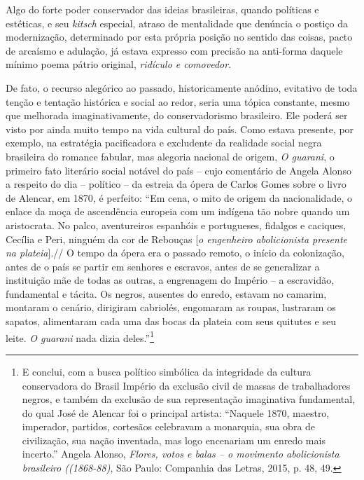 Algo do forte poder conservador das ideias brasileiras, quando políticas
e estéticas, e seu \emph{kitsch} especial, atraso de mentalidade que
denúncia o postiço da modernização, determinado por esta própria posição
no sentido das coisas, pacto de arcaísmo e adulação, já estava expresso
com precisão na anti-forma daquele mínimo poema pátrio original,
\emph{ridículo e comovedor}.

De fato, o recurso alegórico ao passado, historicamente anódino,
evitativo de toda tenção e tentação histórica e social ao redor, seria
uma tópica constante, mesmo que melhorada imaginativamente, do
conservadorismo brasileiro. Ele poderá ser visto por ainda muito tempo
na vida cultural do país. Como estava presente, por exemplo, na
estratégia pacificadora e excludente da realidade social negra
brasileira do romance fabular, mas alegoria nacional de origem, \emph{O
guarani}, o primeiro fato literário social notável do país -- cujo
comentário de Angela Alonso a respeito do dia -- político -- da estreia
da ópera de Carlos Gomes sobre o livro de Alencar, em 1870, é perfeito:
``Em cena, o mito de origem da nacionalidade, o enlace da moça de
ascendência europeia com um indígena tão nobre quando um aristocrata. No
palco, aventureiros espanhóis e portugueses, fidalgos e caciques,
Cecília e Peri, ninguém da cor de Rebouças {[}\emph{o engenheiro
abolicionista presente na plateia}{]}.// O tempo da ópera era o passado
remoto, o início da colonização, antes de o país se partir em senhores e
escravos, antes de se generalizar a instituição mãe de todas as outras,
a engrenagem do Império -- a escravidão, fundamental e tácita. Os
negros, ausentes do enredo, estavam no camarim, montaram o cenário,
dirigiram cabriolés, engomaram as roupas, lustraram os sapatos,
alimentaram cada uma das bocas da plateia com seus quitutes e seu leite.
\emph{O guarani} nada dizia deles.''\footnote{E conclui, com a busca
  político simbólica da integridade da cultura conservadora do Brasil
  Império da exclusão civil de massas de trabalhadores negros, e também
  da exclusão de sua representação imaginativa fundamental, do qual José
  de Alencar foi o principal artista: ``Naquele 1870, maestro,
  imperador, partidos, cortesãos celebravam a monarquia, sua obra de
  civilização, sua nação inventada, mas logo encenariam um enredo mais
  incerto.'' Angela Alonso, \emph{Flores, votos e balas -- o movimento
  abolicionista brasileiro ((1868-88)}, São Paulo: Companhia das Letras,
  2015, p. 48, 49.}

